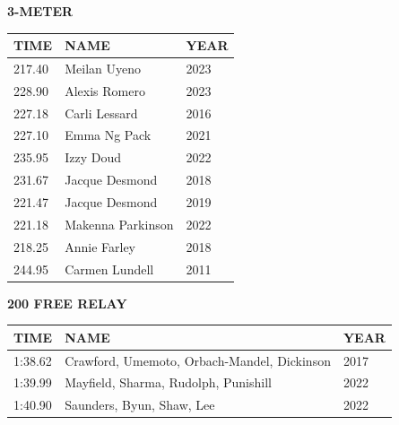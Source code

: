 \begin{table}[H]
\centering
\begin{minipage}[t]{0.6\textwidth}
\centering
\textbf{3-METER}\\[0.1cm]
\begin{tabular}{@{}p{1.8cm}p{2.8cm}p{1.2cm}@{}}
\hline
    \textbf{TIME} & \textbf{NAME} & \textbf{YEAR} \\
\hline
    217.40 & Meilan Uyeno & 2023 \\
    228.90 & Alexis Romero & 2023 \\
    227.18 & Carli Lessard & 2016 \\
    227.10 & Emma Ng Pack & 2021 \\
    235.95 & Izzy Doud & 2022 \\
    231.67 & Jacque Desmond & 2018 \\
    221.47 & Jacque Desmond & 2019 \\
    221.18 & Makenna Parkinson & 2022 \\
    218.25 & Annie Farley & 2018 \\
    244.95 & Carmen Lundell & 2011 \\
\hline
\end{tabular}
\end{minipage}
\end{table}

\begin{table}[H]
\centering
\begin{minipage}[t]{0.6\textwidth}
\centering
\textbf{200 FREE RELAY}\\[0.1cm]
\begin{tabular}{@{}p{1.8cm}p{2.8cm}p{1.2cm}@{}}
\hline
    \textbf{TIME} & \textbf{NAME} & \textbf{YEAR} \\
\hline
    1:38.62 & Crawford, Umemoto, Orbach-Mandel, Dickinson & 2017 \\
    1:39.99 & Mayfield, Sharma, Rudolph, Punishill & 2022 \\
    1:40.90 & Saunders, Byun, Shaw, Lee & 2022 \\
\hline
\end{tabular}
\end{minipage}
\end{table}

